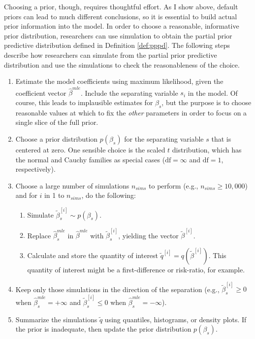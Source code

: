 \documentclass[12pt]{article}
\begin{document}
Choosing a prior, though, requires thoughtful effort. 
As I show above, default priors can lead to much different conclusions, so it is essential to build actual prior information into the model. 
In order to choose a reasonable, informative prior distribution, researchers can use simulation to obtain the partial prior predictive distribution defined in Definition \ref{def:pppd}. 
The following steps describe how researchers can simulate from the partial prior predictive distribution and use the simulations to check the reasonableness of the choice.
\begin{enumerate}
\item Estimate the model coefficients using maximum likelihood, given the coefficient vector $\hat{\beta}^{mle}$. 
Include the separating variable $s_i$ in the model. 
Of course, this leads to implausible estimates for $\beta_s$, but the purpose is to choose reasonable values at which to fix the \emph{other} parameters in order to focus on a single slice of the full prior. 
\item Choose a prior distribution $p(\beta_s)$ for the separating variable $s$ that is centered at zero. 
One sensible choice is the scaled $t$ distribution, which has the normal and Cauchy families as special cases ($\text{df} = \infty$ and $\text{df} = 1$, respectively). 
\item Choose a large number of simulations $n_{sims}$ to perform (e.g., $n_{sims} \geq 10,000$) and for $i$ in 1 to $n_{sims}$, do the following:
	\begin{enumerate}
	\item Simulate $\tilde{\beta}^{[i]}_s \sim p(\beta_s)$.
	\item Replace $\hat{\beta}_s^{mle}$ in $\hat{\beta}^{mle}$ with $\tilde{\beta}^{[i]}_s$, yielding the vector $\tilde{\beta}^{[i]}$.
	\item Calculate and store the quantity of interest $\tilde{q}^{[i]} = q\left(\tilde{\beta}^{[i]}\right)$. 
	This quantity of interest might be a first-difference or risk-ratio, for example.
	\end{enumerate}
\item Keep only those simulations in the direction of the separation (e.g., $\tilde{\beta}_s^{[i]} \geq 0$ when $\hat{\beta}_{s}^{mle} = +\infty$ and $\tilde{\beta}_s^{[i]} \leq 0$ when $\hat{\beta}_{s}^{mle} = -\infty$).
\item Summarize the simulations $\tilde{q}$ using quantiles, histograms, or density plots. 
If the prior is inadequate, then update the prior distribution $p(\beta_s)$.
\end{enumerate}
\end{document}
